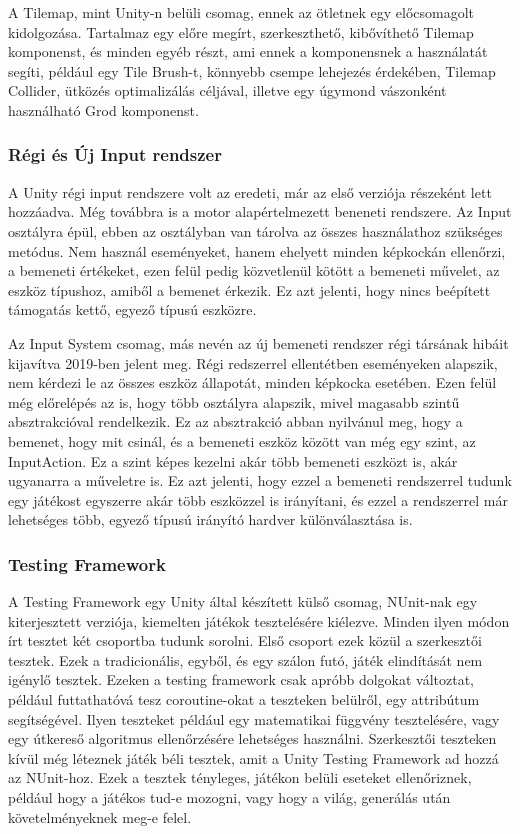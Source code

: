 \documentclass[
]{thesis-ekf}
\theoremstyle{definition}
\theoremstyle{remark}
\begin{document}
	A Tilemap, mint Unity-n belüli csomag, ennek az ötletnek egy előcsomagolt kidolgozása. Tartalmaz egy előre megírt, szerkeszthető, kibővíthető Tilemap komponenst, és minden egyéb részt, ami ennek a komponensnek a használatát segíti, például egy Tile Brush-t, könnyebb csempe lehejezés érdekében, Tilemap Collider, ütközés optimalizálás céljával, illetve egy úgymond vászonként használható Grod komponenst.
	\subsubsection{Régi és Új Input rendszer}
	A Unity régi input rendszere volt az eredeti, már az első verziója részeként lett hozzáadva. Még továbbra is a motor alapértelmezett beneneti rendszere. Az Input osztályra épül, ebben az osztályban van tárolva az összes használathoz szükséges metódus. Nem használ eseményeket, hanem ehelyett minden képkockán ellenőrzi, a bemeneti értékeket, ezen felül pedig közvetlenül kötött a bemeneti művelet, az eszköz típushoz, amiből a bemenet érkezik. Ez azt jelenti, hogy nincs beépített támogatás kettő, egyező típusú eszközre.
	
	Az Input System csomag, más nevén az új bemeneti rendszer régi társának hibáit kijavítva 2019-ben jelent meg. Régi redszerrel ellentétben eseményeken alapszik, nem kérdezi le az összes eszköz állapotát, minden képkocka esetében.  Ezen felül még előrelépés az is, hogy több osztályra alapszik, mivel magasabb szintű absztrakcióval rendelkezik. Ez az absztrakció abban nyilvánul meg, hogy a bemenet, hogy mit csinál, és a bemeneti eszköz között van még egy szint, az InputAction. Ez a szint képes kezelni akár több bemeneti eszközt is, akár ugyanarra a műveletre is. Ez azt jelenti, hogy ezzel a bemeneti rendszerrel tudunk egy játékost egyszerre akár több eszközzel is irányítani, és ezzel a rendszerrel már lehetséges több, egyező típusú irányító hardver különválasztása is.
	
	
	\subsubsection{Testing Framework}
	A Testing Framework egy Unity által készített külső csomag, NUnit-nak egy kiterjesztett verziója, kiemelten játékok tesztelésére kiélezve. Minden ilyen módon írt tesztet két csoportba tudunk sorolni. Első csoport ezek közül a szerkesztői tesztek. Ezek a tradicionális, egyből, és egy szálon futó, játék elindítását nem igénylő tesztek. Ezeken a testing framework csak apróbb dolgokat változtat, például futtathatóvá tesz coroutine-okat a teszteken belülről, egy attribútum segítségével. Ilyen teszteket például egy matematikai függvény tesztelésére, vagy egy útkereső algoritmus ellenőrzésére lehetséges használni. Szerkesztői teszteken kívül még léteznek játék béli tesztek, amit a Unity Testing Framework ad hozzá az NUnit-hoz. Ezek a tesztek tényleges, játékon belüli eseteket ellenőriznek, például hogy a játékos tud-e mozogni, vagy hogy a világ, generálás után követelményeknek meg-e felel.
	
\end{document}
